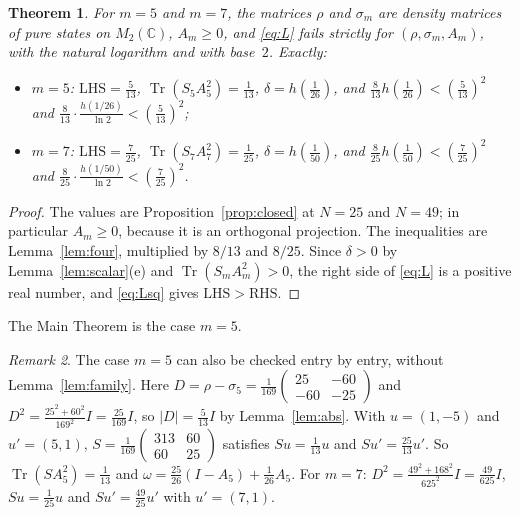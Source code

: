 \documentclass[11pt]{amsart}
\newtheorem{theorem}{Theorem}[section]
\theoremstyle{definition}\newtheorem{definition}[theorem]{Definition}
\theoremstyle{remark}\newtheorem{remark}[theorem]{Remark}
\DeclareMathOperator{\Tr}{Tr}
\newcommand{\C}{\mathbb{C}}
\newcommand{\abs}[1]{\lvert #1\rvert}
\newcommand{\LHS}{\mathrm{LHS}}
\newcommand{\RHS}{\mathrm{RHS}}
\begin{document}
\begin{theorem}\label{thm:witness}
For \(m=5\) and \(m=7\), the matrices \(\rho\) and \(\sigma_m\) are density matrices of pure states on \(M_2(\C)\), \(A_m\ge0\), and \eqref{eq:L} fails strictly for \((\rho,\sigma_m,A_m)\), with the natural logarithm and with base~\(2\). Exactly:
\begin{itemize}
\item \(m=5\): \(\LHS=\frac{5}{13}\), \(\Tr(S_5A_5^2)=\frac{1}{13}\), \(\delta=h(\frac{1}{26})\), and \(\frac{8}{13}h(\frac{1}{26})<(\frac{5}{13})^2\) and \(\frac{8}{13}\cdot\frac{h(1/26)}{\ln2}<(\frac{5}{13})^2\);
\item \(m=7\): \(\LHS=\frac{7}{25}\), \(\Tr(S_7A_7^2)=\frac{1}{25}\), \(\delta=h(\frac{1}{50})\), and \(\frac{8}{25}h(\frac{1}{50})<(\frac{7}{25})^2\) and \(\frac{8}{25}\cdot\frac{h(1/50)}{\ln2}<(\frac{7}{25})^2\).
\end{itemize}
\end{theorem}

\begin{proof}
The values are Proposition~\ref{prop:closed} at \(N=25\) and \(N=49\); in particular \(A_m\ge0\), because it is an orthogonal projection. The inequalities are Lemma~\ref{lem:four}, multiplied by \(8/13\) and \(8/25\). Since \(\delta>0\) by Lemma~\ref{lem:scalar}(e) and \(\Tr(S_mA_m^2)>0\), the right side of \eqref{eq:L} is a positive real number, and \eqref{eq:Lsq} gives \(\LHS>\RHS\).
\end{proof}

The Main Theorem is the case \(m=5\).

\begin{remark}\label{rem:direct}
The case \(m=5\) can also be checked entry by entry, without Lemma~\ref{lem:family}. Here \(D=\rho-\sigma_5=\frac{1}{169}\begin{pmatrix}25&-60\\-60&-25\end{pmatrix}\) and \(D^2=\frac{25^2+60^2}{169^2}I=\frac{25}{169}I\), so \(\abs{D}=\frac{5}{13}I\) by Lemma~\ref{lem:abs}. With \(u=(1,-5)\) and \(u'=(5,1)\), \(S=\frac{1}{169}\begin{pmatrix}313&60\\60&25\end{pmatrix}\) satisfies \(Su=\frac{1}{13}u\) and \(Su'=\frac{25}{13}u'\). So \(\Tr(SA_5^2)=\frac{1}{13}\) and \(\omega=\frac{25}{26}(I-A_5)+\frac{1}{26}A_5\). For \(m=7\): \(D^2=\frac{49^2+168^2}{625^2}I=\frac{49}{625}I\), \(Su=\frac{1}{25}u\) and \(Su'=\frac{49}{25}u'\) with \(u'=(7,1)\).
\end{remark}
\end{document}
